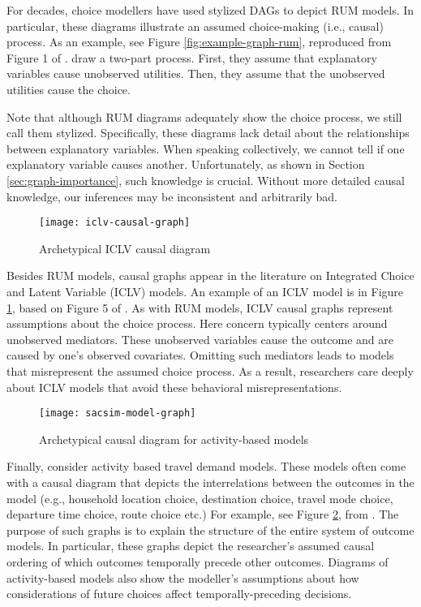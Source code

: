 For decades, choice modellers have used stylized DAGs to depict RUM models.
In particular, these diagrams illustrate an assumed choice-making (i.e., causal) process.
As an example, see Figure \ref{fig:example-graph-rum}, reproduced from Figure 1 of \citet{ben_2002_integration}.
\citeauthor{ben_2002_integration} draw a two-part process.
First, they assume that explanatory variables cause unobserved utilities.
Then, they assume that the unobserved utilities cause the choice.

Note that although RUM diagrams adequately show the choice process, we still call them stylized.
Specifically, these diagrams lack detail about the relationships between explanatory variables.
When speaking collectively, we cannot tell if one explanatory variable causes another.
Unfortunately, as shown in Section \ref{sec:graph-importance}, such knowledge is crucial.
Without more detailed causal knowledge, our inferences may be inconsistent and arbitrarily bad.

\begin{figure}
   \centering
   \texttt{[image: iclv-causal-graph]}
   \caption{Archetypical ICLV causal diagram}
   \label{fig:example-graph-iclv}
\end{figure}


Besides RUM models, causal graphs appear in the literature on Integrated Choice and Latent Variable (ICLV) models.
An example of an ICLV model is in Figure \ref{fig:example-graph-iclv}, based on Figure 5 of \citet{ben_2002_integration}.
As with RUM models, ICLV causal graphs represent assumptions about the choice process.
Here concern typically centers around unobserved mediators.
These unobserved variables cause the outcome and are caused by one's observed covariates.
Omitting such mediators leads to models that misrepresent the assumed choice process.
As a result, researchers care deeply about ICLV models that avoid these behavioral misrepresentations.

\begin{figure}
   \centering
   \texttt{[image: sacsim-model-graph]}
   \caption{Archetypical causal diagram for activity-based models}
   \label{fig:example-graph-abm}
\end{figure}

Finally, consider activity based travel demand models.
These models often come with a causal diagram that depicts the interrelations between the outcomes in the model (e.g., household location choice, destination choice, travel mode choice, departure time choice, route choice etc.)
For example, see Figure \ref{fig:example-graph-abm}, from \citet[Fig.1]{bradley_2010_sacsim}.
The purpose of such graphs is to explain the structure of the entire system of outcome models.
In particular, these graphs depict the researcher's assumed causal ordering of which outcomes temporally precede other outcomes.
Diagrams of activity-based models also show the modeller's assumptions about how considerations of future choices affect temporally-preceding decisions.

